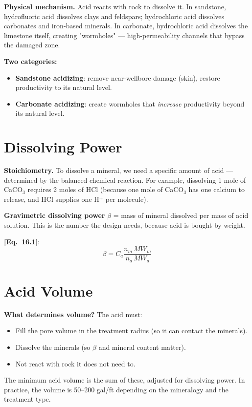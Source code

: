 \documentclass[11pt,a4paper,openany]{book}
\newcommand{\eqrefbook}[1]{\textcolor{blue!60!black}{\textbf{[Eq.~#1]}}}
\begin{document}
\begin{theory}
\textbf{Physical mechanism.} Acid reacts with rock to dissolve it.
In sandstone, hydrofluoric acid dissolves clays and feldspars;
hydrochloric acid dissolves carbonates and iron-based minerals. In
carbonate, hydrochloric acid dissolves the limestone itself, creating
"wormholes" — high-permeability channels that bypass the damaged
zone.

\textbf{Two categories:}
\begin{itemize}
  \item \textbf{Sandstone acidizing}: remove near-wellbore damage
        (skin), restore productivity to its natural level.
  \item \textbf{Carbonate acidizing}: create wormholes that
        \emph{increase} productivity beyond its natural level.
\end{itemize}
\end{theory}

\section{Dissolving Power}

\begin{theory}
\textbf{Stoichiometry.} To dissolve a mineral, we need a specific
amount of acid — determined by the balanced chemical reaction. For
example, dissolving 1 mole of CaCO$_3$ requires 2 moles of HCl
(because one mole of CaCO$_3$ has one calcium to release, and HCl
supplies one H$^+$ per molecule).

\textbf{Gravimetric dissolving power} $\beta$ = mass of mineral
dissolved per mass of acid solution. This is the number the design
needs, because acid is bought by weight.
\end{theory}

\eqrefbook{16.1}:
\begin{equation}
  \beta = C_a\frac{n_m\,MW_m}{n_a\,MW_a}
\end{equation}

\section{Acid Volume}

\begin{theory}
\textbf{What determines volume?} The acid must:
\begin{itemize}
  \item Fill the pore volume in the treatment radius (so it can
        contact the minerals).
  \item Dissolve the minerals (so $\beta$ and mineral content matter).
  \item Not react with rock it does not need to.
\end{itemize}

The minimum acid volume is the sum of these, adjusted for dissolving
power. In practice, the volume is 50--200 gal/ft depending on the
mineralogy and the treatment type.
\end{theory}
\end{document}
